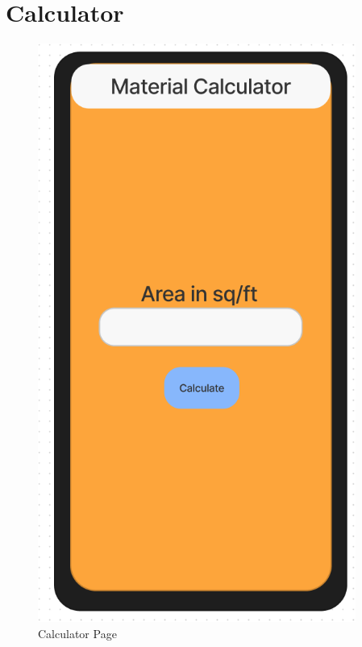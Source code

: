 \documentclass[title page]{article}
\begin{document}
\section{Calculator}
\begin{figure}[!h]
    \begin{center}
          \includegraphics[height=19cm]{images/calculator.png}
          \caption{Calculator Page}
          \label{fig:calculator}
    \end{center}
\end{figure}
\end{document}
